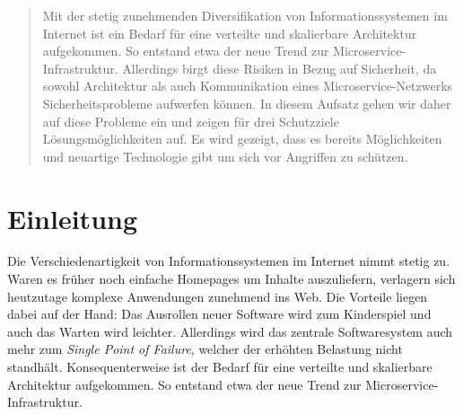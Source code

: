 \documentclass[12pt]{article}
\begin{document}
	
\makeatletter
\def\@maketitle{%
	\newpage
	\null
	\vskip 2em%
	\begin{center}%
		\let \footnote \thanks
		{\LARGE\bfseries \@title \par}%
		\vskip .5em%
		{\Large \@subtitle \par}%
		\vskip 1.5em%
		{\large
			\lineskip .5em%
			\begin{tabular}[t]{c}%
				\@author
			\end{tabular}\par}%
		\vskip 1em%
		{\large \@date}%
	\end{center}%
	\par
	\vskip 1.5em}
\makeatother

\maketitle
\begin{abstract}
	Mit der stetig zunehmenden Diversifikation von Informationssystemen im Internet ist ein Bedarf für eine verteilte und skalierbare Architektur aufgekommen. So entstand etwa der neue Trend zur Microservice-Infrastruktur.
	Allerdings birgt diese Risiken in Bezug auf Sicherheit, da sowohl Architektur als auch Kommunikation eines Microservice-Netzwerks Sicherheitsprobleme aufwerfen können.
	In diesem Aufsatz gehen wir daher auf diese Probleme ein und zeigen für drei Schutzziele Lösungsmöglichkeiten auf.
	Es wird gezeigt, dass es bereits Möglichkeiten und neuartige Technologie gibt um sich vor Angriffen zu schützen.
\end{abstract}

\section{Einleitung}
\label{sec:einleitung}

Die Verschiedenartigkeit von Informationssystemen im Internet nimmt stetig zu. Waren es früher noch einfache Homepages um Inhalte auszuliefern, verlagern sich heutzutage komplexe Anwendungen zunehmend ins Web. Die Vorteile liegen dabei auf der Hand: Das Ausrollen neuer Software wird zum Kinderspiel und auch das Warten wird leichter. Allerdings wird das zentrale Softwaresystem auch mehr zum \textit{Single Point of Failure}, welcher der erhöhten Belastung nicht standhält. Konsequenterweise ist der Bedarf für eine verteilte und skalierbare Architektur aufgekommen. So entstand etwa der neue Trend zur Microservice-Infrastruktur.
\end{document}
